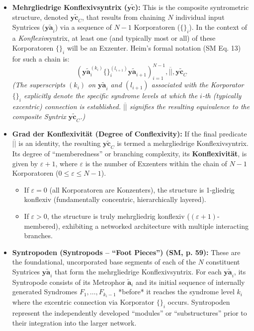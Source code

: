 \documentclass[
    12pt,              %
    a4paper,           %
    headings=normal,   %
    twoside=true,      %
    BCOR=8mm,          %
]{scrbook}
\newcommand{\q}[1]{\enquote{#1}}
\newcommand{\syntrix}{\bm{y\widetilde{a}}}
\newcommand{\metrophor}{\bm{\widetilde{a}}}
\newcommand{\konflexivsyntrix}{\bm{y\widetilde{c}}}
\begin{document}
\begin{itemize}
    \item   \textbf{Mehrgliedrige Konflexivsyntrix (\(\konflexivsyntrix\)):} This is the composite syntrometric structure, denoted \(\konflexivsyntrix_C\), that results from chaining \(N\) individual input Syntrices (\(\syntrix_i\)) via a sequence of \(N-1\) Korporatoren (\(\{ \}_i\)). In the context of a \textit{Konflexiv}syntrix, at least one (and typically most or all) of these Korporatoren \(\{ \}_i\) will be an Exzenter. Heim's formal notation (SM Eq. 13) for such a chain is:
    \begin{equation} \label{eq:mehrgliedrige_konflexivsyntrix_original_2_revised} 
        \left( \syntrix_i^{(k_i)} \{ \}_i^{(l_{i+1})} \syntrix_{i+1} \right)_{i=1}^{N-1}, \overline{||}, \konflexivsyntrix_C 
    \end{equation}
    \textit{(The superscripts \((k_i)\) on \(\syntrix_i\) and \((l_{i+1})\) associated with the Korporator \(\{ \}_i\) explicitly denote the specific syndrome levels at which the \(i\)-th (typically excentric) connection is established. \(\overline{||}\) signifies the resulting equivalence to the composite Syntrix \(\konflexivsyntrix_C\).)}

    \item   \textbf{Grad der Konflexivität (Degree of Conflexivity):} If the final predicate \(\overline{||}\) is an identity, the resulting \(\konflexivsyntrix_C\) is termed a mehrgliedrige Konflexivsyntrix. Its degree of \q{memberedness} or branching complexity, its \textbf{Konflexivität}, is given by \(\varepsilon+1\), where \(\varepsilon\) is the number of Exzenters within the chain of \(N-1\) Korporatoren (\(0 \le \varepsilon \le N-1\)).
        \begin{itemize}
            \item   If \(\varepsilon = 0\) (all Korporatoren are Konzenters), the structure is 1-gliedrig konflexiv (fundamentally concentric, hierarchically layered).
            \item   If \(\varepsilon > 0\), the structure is truly mehrgliedrig konflexiv (\((\varepsilon+1)\)-membered), exhibiting a networked architecture with multiple interacting branches.
        \end{itemize}

    \item   \textbf{Syntropoden (Syntropods – \q{Foot Pieces}) (SM, p. 59):} These are the foundational, uncorporated base segments of each of the \(N\) constituent Syntrices \(\syntrix_i\) that form the mehrgliedrige Konflexivsyntrix. For each \(\syntrix_i\), its Syntropode consists of its Metrophor \(\metrophor_i\) and its initial sequence of internally generated Syndromes \(F_1, \ldots, F_{k_i-1}\) *before* it reaches the syndrome level \(k_i\) where the excentric connection via Korporator \(\{ \}_i\) occurs. Syntropoden represent the independently developed \q{modules} or \q{substructures} prior to their integration into the larger network.


\end{itemize}
\end{document}
